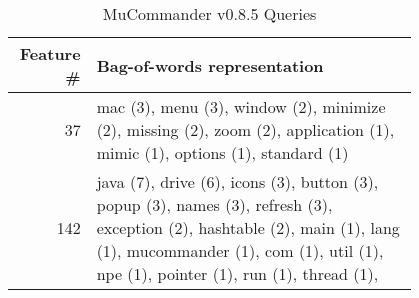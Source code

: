\begin{table}[t]
\renewcommand{\arraystretch}{1.3}
\footnotesize
\centering
\caption{MuCommander v0.8.5 Queries}
\begin{tabular}{r|p{0.8\linewidth}}
\toprule
Feature \# & Bag-of-words representation \\
\midrule
37         &

        mac (3),
        menu (3),
        window (2),
        minimize (2),
        missing (2),
        zoom (2),
        application (1),
        mimic (1),
        options (1),
        standard (1)


\\
142       &

        java (7),
        drive (6),
        icons (3),
        button (3),
        popup (3),
        names (3),
        refresh (3),
        exception (2),
        hashtable (2),
        main (1),
        lang (1),
        mucommander (1),
        com (1),
        util (1),
        npe (1),
        pointer (1),
        run (1),
        thread (1),

\\
\bottomrule
\end{tabular}
\label{table:muqueries}
\end{table}

